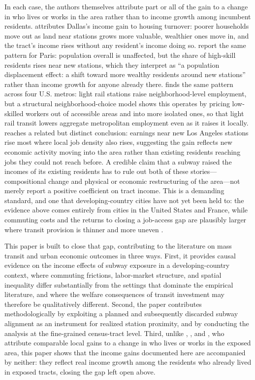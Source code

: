 In each case, the authors themselves attribute part or all of the gain to a change in who lives or works in the area rather than to income growth among incumbent residents. \citet{heilmann2018transit} attributes Dallas's income gain to housing turnover: poorer households move out as land near stations grows more valuable, wealthier ones move in, and the tract's income rises without any resident's income doing so. \citet{mayertrevien2017largescale} report the same pattern for Paris: population overall is unaffected, but the share of high-skill residents rises near new stations, which they interpret as ``a population displacement effect: a shift toward more wealthy residents around new stations'' rather than income growth for anyone already there. \citet{tyndall2021local} finds the same pattern across four U.S. metros: light rail stations raise neighborhood-level employment, but a structural neighborhood-choice model shows this operates by pricing low-skilled workers out of accessible areas and into more isolated ones, so that light rail transit lowers aggregate metropolitan employment even as it raises it locally. \citet{yen2024rapid} reaches a related but distinct conclusion: earnings near new Los Angeles stations rise most where local job density also rises, suggesting the gain reflects new economic activity moving into the area rather than existing residents reaching jobs they could not reach before. A credible claim that a subway raised the incomes of its existing residents has to rule out both of these stories---compositional change and physical or economic restructuring of the area---not merely report a positive coefficient on tract income. This is a demanding standard, and one that developing-country cities have not yet been held to: the evidence above comes entirely from cities in the United States and France, while commuting costs and the returns to closing a job-access gap are plausibly larger where transit provision is thinner and more uneven \citep{tsivanidis2026evaluating}.

This paper is built to close that gap, contributing to the literature on mass transit and urban economic outcomes in three ways. First, it provides causal evidence on the income effects of subway exposure in a developing-country context, where commuting frictions, labor-market structure, and spatial inequality differ substantially from the settings that dominate the empirical literature, and where the welfare consequences of transit investment may therefore be qualitatively different. Second, the paper contributes methodologically by exploiting a planned and subsequently discarded subway alignment as an instrument for realized station proximity, and by conducting the analysis at the fine-grained census-tract level. Third, unlike \citet{heilmann2018transit}, \citet{mayertrevien2017largescale}, and \citet{tyndall2021local}, who attribute comparable local gains to a change in who lives or works in the exposed area, this paper shows that the income gains documented here are accompanied by neither: they reflect real income growth among the residents who already lived in exposed tracts, closing the gap left open above.


